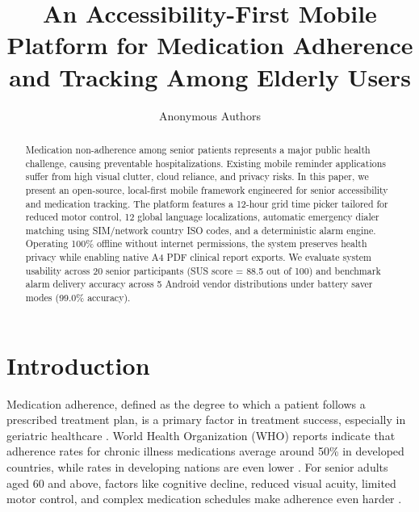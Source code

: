 \documentclass[10pt]{article}
\begin{document}
\begin{opening}

\title{An Accessibility-First Mobile Platform for Medication Adherence and Tracking Among Elderly Users}

\author[Anonymous Institution]{Anonymous Authors}

\begin{abstract}
Medication non-adherence among senior patients represents a major public health challenge, causing preventable hospitalizations. Existing mobile reminder applications suffer from high visual clutter, cloud reliance, and privacy risks. In this paper, we present an open-source, local-first mobile framework engineered for senior accessibility and medication tracking. The platform features a 12-hour grid time picker tailored for reduced motor control, 12 global language localizations, automatic emergency dialer matching using SIM/network country ISO codes, and a deterministic alarm engine. Operating 100\% offline without internet permissions, the system preserves health privacy while enabling native A4 PDF clinical report exports. We evaluate system usability across 20 senior participants (SUS score = 88.5 out of 100) and benchmark alarm delivery accuracy across 5 Android vendor distributions under battery saver modes (99.0\% accuracy).
\end{abstract}


\end{opening}

\section{Introduction}

Medication adherence, defined as the degree to which a patient follows a prescribed treatment plan, is a primary factor in treatment success, especially in geriatric healthcare \cite{who2003adherence}. World Health Organization (WHO) reports indicate that adherence rates for chronic illness medications average around 50\% in developed countries, while rates in developing nations are even lower \cite{who2003adherence}. For senior adults aged 60 and above, factors like cognitive decline, reduced visual acuity, limited motor control, and complex medication schedules make adherence even harder \cite{haynes2002helping}.
\end{document}
